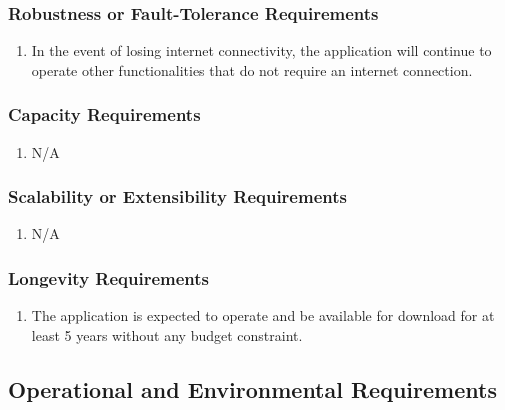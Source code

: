 \documentclass[titlepage]{article}
\begin{document}
\subsubsection{Robustness or Fault-Tolerance Requirements}
\label{ssub:robustness_or_fault_tolerance_requirements}
\begin{enumerate}[{PR}1. ]
	\item In the event of losing internet connectivity, the application will continue to operate other functionalities that do not require an internet connection. 
\end{enumerate}

\subsubsection{Capacity Requirements}
\label{ssub:capacity_requirements}
\begin{enumerate}[{PR}1. ]
	\item N/A
\end{enumerate}

\subsubsection{Scalability or Extensibility Requirements}
\label{ssub:scalability_or_extensibility_requirements}
\begin{enumerate}[{PR}1. ]
	\item N/A
\end{enumerate}

\subsubsection{Longevity Requirements}
\label{ssub:longevity_requirements}
\begin{enumerate}[{PR}1. ]
	\item The application is expected to operate and be available for download for at least 5 years without any budget constraint. 
\end{enumerate}


\subsection{Operational and Environmental Requirements}
\label{sub:operational_and_environmental_requirements}
\end{document}
